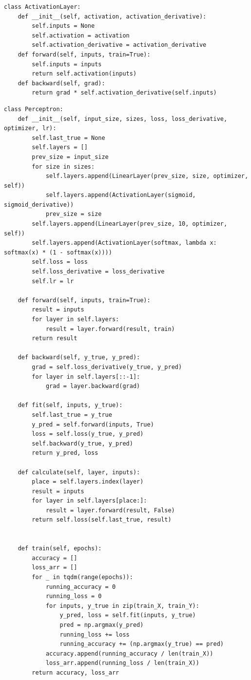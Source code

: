 \documentclass[a4paper, 14pt]{extarticle}
\begin{document}
\begin{lstlisting}[language={},caption={Класс слоя активации},label={lst:code4}, breaklines=true]
class ActivationLayer:
    def __init__(self, activation, activation_derivative):
        self.inputs = None
        self.activation = activation
        self.activation_derivative = activation_derivative
    def forward(self, inputs, train=True):
        self.inputs = inputs
        return self.activation(inputs)
    def backward(self, grad):
        return grad * self.activation_derivative(self.inputs)

\end{lstlisting}




\begin{lstlisting}[language={},caption={Класс перцептрона},label={lst:code5}, breaklines=true]
class Perceptron:
    def __init__(self, input_size, sizes, loss, loss_derivative, optimizer, lr):
        self.last_true = None
        self.layers = []
        prev_size = input_size
        for size in sizes:
            self.layers.append(LinearLayer(prev_size, size, optimizer, self))
            self.layers.append(ActivationLayer(sigmoid, sigmoid_derivative))
            prev_size = size
        self.layers.append(LinearLayer(prev_size, 10, optimizer, self))
        self.layers.append(ActivationLayer(softmax, lambda x: softmax(x) * (1 - softmax(x))))
        self.loss = loss
        self.loss_derivative = loss_derivative
        self.lr = lr

    def forward(self, inputs, train=True):
        result = inputs
        for layer in self.layers:
            result = layer.forward(result, train)
        return result

    def backward(self, y_true, y_pred):
        grad = self.loss_derivative(y_true, y_pred)
        for layer in self.layers[::-1]:
            grad = layer.backward(grad)

    def fit(self, inputs, y_true):
        self.last_true = y_true
        y_pred = self.forward(inputs, True)
        loss = self.loss(y_true, y_pred)
        self.backward(y_true, y_pred)
        return y_pred, loss

    def calculate(self, layer, inputs):
        place = self.layers.index(layer)
        result = inputs
        for layer in self.layers[place:]:
            result = layer.forward(result, False)
        return self.loss(self.last_true, result)


    def train(self, epochs):
        accuracy = []
        loss_arr = []
        for _ in tqdm(range(epochs)):
            running_accuracy = 0
            running_loss = 0
            for inputs, y_true in zip(train_X, train_Y):
                y_pred, loss = self.fit(inputs, y_true)
                pred = np.argmax(y_pred)
                running_loss += loss
                running_accuracy += (np.argmax(y_true) == pred)
            accuracy.append(running_accuracy / len(train_X))
            loss_arr.append(running_loss / len(train_X))
        return accuracy, loss_arr


\end{lstlisting}
\end{document}
